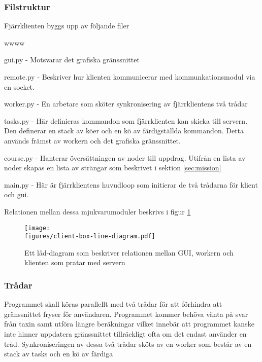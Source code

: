 \documentclass[tekniskrapport/tech.tex]{subfiles}
\begin{document}
\subsubsection{Filstruktur}
Fjärrklienten byggs upp av följande filer

\begin{labeling}{wwww}
	\item[gui.py] - Motsvarar det grafiska gränssnittet
	
	\item[remote.py] - Beskriver hur klienten kommunicerar med
		kommunkationsmodul via en socket.

	\item[worker.py] - En arbetare som sköter synkronisering av
		fjärrklientens två trådar
	
	\item[tasks.py] - Här definieras kommandon som fjärrklienten kan skicka
		till servern. Den definerar en stack av köer och en kö av
		färdigställda kommandon.  Detta används främst av workern och
		det grafiska gränssnittet.
    
    \item[course.py] - Hanterar översättningen av noder till uppdrag. Utifrån
    en lista av noder skapas en lista av strängar som beskrivet i sektion
    \ref{sec:mission}

    \item[main.py] - Här är fjärrklientens huvudloop som initierar de två
    trådarna för klient och gui.

\end{labeling}
Relationen mellan dessa mjukvarumoduler beskrivs i figur \ref{boxclient}

\begin{figure}[h]
\centering
	\texttt{[image: \\figures/client-box-line-diagram.pdf]}
	\caption{Ett låd-diagram som beskriver relationen mellan GUI,
	workern och klienten som pratar med servern}
	\label{boxclient}
\end{figure} 

\subsubsection{Trådar}
Programmet skall köras parallellt med två trådar för att förhindra att
gränssnittet fryser för användaren. Programmet kommer behöva vänta på svar från
taxin samt utföra längre beräkningar vilket innebär att programmet kanske inte
hinner uppdatera gränssnittet tillräckligt ofta om det endast använder en tråd.
Synkroniseringen av dessa två trådar sköts av en worker som består av
en stack av tasks och en kö av färdiga 
\end{document}
